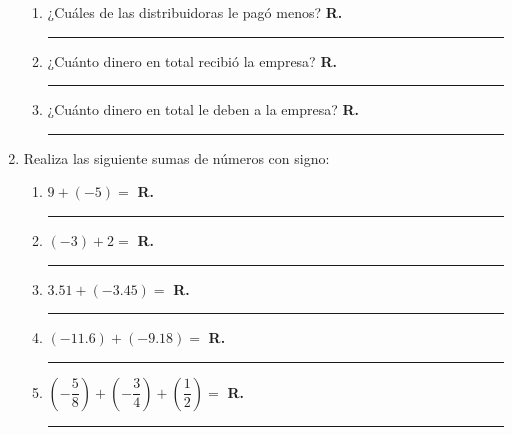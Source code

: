 \begin{enumerate}
\begin{enumerate}[label=\alph*)]
\item ¿Cuáles de las distribuidoras le pagó menos? \textbf{R.} \rule{2cm}{0.1mm}
\item ¿Cuánto dinero en total recibió la empresa? \textbf{R.} \rule{2cm}{0.1mm}
\item ¿Cuánto dinero en total le deben a la empresa? \textbf{R.} \rule{2cm}{0.1mm}
\end{enumerate}
\item Realiza las siguiente sumas de números con signo:
\begin{enumerate}[label=\alph*)]
\item $9 + (-5) = $ \textbf{R.} \rule{2cm}{0.1mm}
\item $(-3) + 2 = $ \textbf{R.} \rule{2cm}{0.1mm}
\item $3.51 + (-3.45) = $ \textbf{R.} \rule{2cm}{0.1mm}
\item $(-11.6) + (-9.18) = $ \textbf{R.} \rule{2cm}{0.1mm}
\item $\left(- \dfrac{5}{8} \right) + \left(- \dfrac{3}{4} \right) + \left( \dfrac{1}{2} \right) = $ \textbf{R.} \rule{2cm}{0.1mm}
\end{enumerate}
\end{enumerate}

